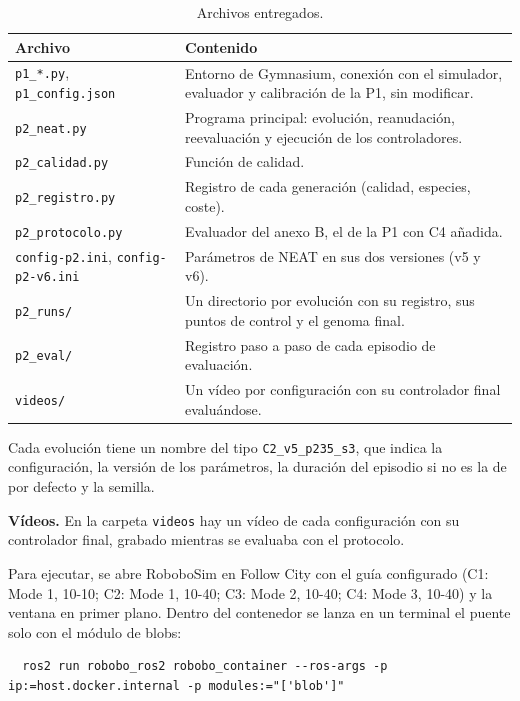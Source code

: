 \documentclass[11pt,a4paper]{article}
\newcommand{\code}[1]{\texttt{#1}}
\begin{document}
\begin{table}[h]
\centering\small
\caption{Archivos entregados.}
\label{tab:archivos}
\begin{tabularx}{\textwidth}{@{}lX@{}}
\toprule
Archivo & Contenido \\
\midrule
\code{p1\_*.py}, \code{p1\_config.json} & Entorno de Gymnasium, conexión con el simulador, evaluador y calibración de la P1, sin modificar. \\
\code{p2\_neat.py} & Programa principal: evolución, reanudación, reevaluación y ejecución de los controladores. \\
\code{p2\_calidad.py} & Función de calidad. \\
\code{p2\_registro.py} & Registro de cada generación (calidad, especies, coste). \\
\code{p2\_protocolo.py} & Evaluador del anexo B, el de la P1 con C4 añadida. \\
\code{config-p2.ini}, \code{config-p2-v6.ini} & Parámetros de NEAT en sus dos versiones (v5 y v6). \\
\code{p2\_runs/} & Un directorio por evolución con su registro, sus puntos de control y el genoma final. \\
\code{p2\_eval/} & Registro paso a paso de cada episodio de evaluación. \\
\code{videos/} & Un vídeo por configuración con su controlador final evaluándose. \\
\bottomrule
\end{tabularx}
\end{table}

Cada evolución tiene un nombre del tipo \code{C2\_v5\_p235\_s3}, que indica la configuración, la versión de los
parámetros, la duración del episodio si no es la de por defecto y la semilla.

\textbf{Vídeos.} En la carpeta \code{videos} hay un vídeo de cada configuración con su controlador final, grabado
mientras se evaluaba con el protocolo.

Para ejecutar, se abre RoboboSim en Follow City con el guía configurado (C1: Mode 1, 10-10; C2: Mode 1, 10-40;
C3: Mode 2, 10-40; C4: Mode 3, 10-40) y la ventana en primer plano. Dentro del contenedor se lanza en un terminal
el puente solo con el módulo de blobs:

{\small
\begin{verbatim}
  ros2 run robobo_ros2 robobo_container --ros-args -p ip:=host.docker.internal -p modules:="['blob']"
\end{verbatim}
}
\end{document}
